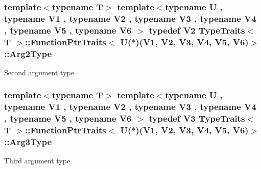 \subsubsection[{\texorpdfstring{Arg2\+Type}{Arg2Type}}]{\setlength{\rightskip}{0pt plus 5cm}template$<$typename T$>$ template$<$typename U , typename V1 , typename V2 , typename V3 , typename V4 , typename V5 , typename V6 $>$ typedef V2 {\bf Type\+Traits}$<$ T $>$\+::{\bf Function\+Ptr\+Traits}$<$ U($\ast$)(V1, V2, V3, V4, V5, V6)$>$\+::{\bf Arg2\+Type}}\hypertarget{structTypeTraits_1_1FunctionPtrTraits_3_01U_07_5_08_07V1_00_01V2_00_01V3_00_01V4_00_01V5_00_01V6_08_4_a7e21720608853ba49f8dfc94a9d28db3}{}\label{structTypeTraits_1_1FunctionPtrTraits_3_01U_07_5_08_07V1_00_01V2_00_01V3_00_01V4_00_01V5_00_01V6_08_4_a7e21720608853ba49f8dfc94a9d28db3}
Second argument type. 
\subsubsection[{\texorpdfstring{Arg3\+Type}{Arg3Type}}]{\setlength{\rightskip}{0pt plus 5cm}template$<$typename T$>$ template$<$typename U , typename V1 , typename V2 , typename V3 , typename V4 , typename V5 , typename V6 $>$ typedef V3 {\bf Type\+Traits}$<$ T $>$\+::{\bf Function\+Ptr\+Traits}$<$ U($\ast$)(V1, V2, V3, V4, V5, V6)$>$\+::{\bf Arg3\+Type}}\hypertarget{structTypeTraits_1_1FunctionPtrTraits_3_01U_07_5_08_07V1_00_01V2_00_01V3_00_01V4_00_01V5_00_01V6_08_4_afe267a3f617d6186d9034de80981fc2b}{}\label{structTypeTraits_1_1FunctionPtrTraits_3_01U_07_5_08_07V1_00_01V2_00_01V3_00_01V4_00_01V5_00_01V6_08_4_afe267a3f617d6186d9034de80981fc2b}
Third argument type. 
